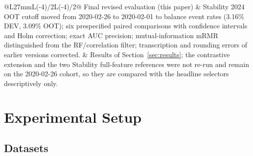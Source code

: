 \documentclass[final,5p,twocolumn]{elsarticle}
\begin{document}
\begin{table}[htbp]
\begin{threeparttable}
\begin{tabular}{@{}L{27mm}L{\dimexpr(\textwidth-27mm-4\tabcolsep)/2\relax}L{\dimexpr(\textwidth-27mm-4\tabcolsep)/2\relax}@{}}
\addlinespace
Final revised evaluation (this paper) & Stability 2024 OOT cutoff moved from 2020-02-26 to 2020-02-01 to balance event rates (3.16\% DEV, 3.09\% OOT); six prespecified paired comparisons with confidence intervals and Holm correction; exact AUC precision; mutual-information mRMR distinguished from the RF/correlation filter; transcription and rounding errors of earlier versions corrected. & Results of Section~\ref{sec:results}; the contrastive extension and the two Stability full-feature references were not re-run and remain on the 2020-02-26 cohort, so they are compared with the headline selectors descriptively only. \\
\bottomrule
\end{tabular}
\end{threeparttable}
\end{table}


\section{Experimental Setup}
\label{sec:experimental_setup}

\subsection{Datasets}
\label{subsec:datasets}
\end{document}
